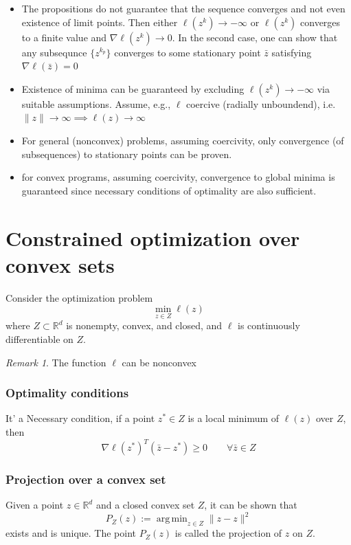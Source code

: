 \documentclass[openany]{book}
\DeclareMathOperator*{\argmin}{arg\,min}  %
\newcommand{\R}{\mathbb{R}}               %
\theoremstyle{definition}
\theoremstyle{remark}
\newtheorem*{remark}{Remark}
\begin{document}
\begin{itemize}
    \item The propositions do not guarantee that the sequence converges and not even existence of limit points. Then either $\ell(z^k)\to-\infty$ or $\ell(z^k)$ converges to a finite value and $\nabla\ell(z^k)\to 0$. In the second case, one can show that any subsequnce $\{z^{k_p}\}$ converges to some stationary point $\bar{z}$ satisfying $\nabla\ell(\bar{z})=0$
    \item Existence of minima can be guaranteed by excluding $\ell(z^k)\to-\infty$ via suitable assumptions. Assume, e.g., $\ell$ coercive (radially unboundend), i.e. $\|z\|\to\infty\implies \ell(z)\to\infty$
    \item For general (nonconvex) problems, assuming coercivity, only convergence (of subsequences) to stationary points can be proven.
    \item for convex programs, assuming coercivity, convergence to global minima is guaranteed since necessary conditions of optimality are also sufficient.
\end{itemize}

\section{Constrained optimization over convex sets}

Consider the optimization problem 
\[
    \min_{z\in Z}\ell(z)
\]
where $Z \subset \R^d$ is nonempty, convex, and closed, and $\ell$ is continuously differentiable on $Z$. 
\begin{remark}
    The function $\ell$ can be nonconvex
\end{remark}

\subsubsection{Optimality conditions}
It' a Necessary condition, if a point $z^* \in Z$ is a local minimum of $\ell(z)$ over $Z$, then 
\[
    \nabla\ell(z^*)^T(\bar{z}-z^*)\geq 0 \qquad \forall\bar{z}\in Z
\]


\subsubsection{Projection over a convex set}
Given a point $z\in\R^d$ and a closed convex set $Z$, it can be shown that 
\[
    P_Z(z) := \argmin_{z\in Z}\|z-z\|^2
\]
exists and is unique. The point $P_Z(z)$ is called the projection of $z$ on $Z$.
\end{document}
